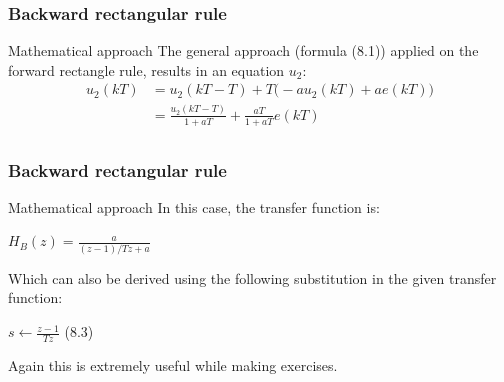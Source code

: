 \begin{frame}
	\frametitle{Backward rectangular rule}	
	\begin{block}{Mathematical approach}
		The general approach (formula (8.1)) applied on the forward rectangle rule, results in an equation $u_2$:
		\begin{align*}
		u_2(kT)& =u_2(kT - T) + T\big(-au_2(kT) + ae(kT) \big)\\
		&=\frac{u_2(kT - T)}{1 + aT} + \frac{aT}{1 + aT}e(kT)\\
		\end{align*}
	\end{block}
\end{frame}

\begin{frame}
	\frametitle{Backward rectangular rule}
	\begin{block}{Mathematical approach}
		In this case, the transfer function is:
		\begin{center}
			$H_B(z) = \frac{a}{(z-1)/Tz+a}$
		\end{center}
		Which can also be derived using the following substitution in the given transfer function:
		\begin{center}
			$s \gets \frac{z-1}{Tz}$ (8.3)
		\end{center}
		Again this is extremely useful while making exercises.
	\end{block}
\end{frame}

